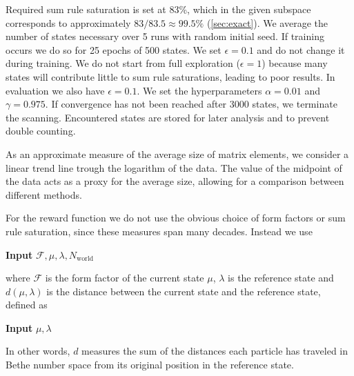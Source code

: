 \documentclass[11pt, a4paper]{report} %
\begin{document}
Required sum rule saturation is set at 83\%, which in the given subspace corresponds to approximately \(83/83.5\approx99.5\%\) (\cref{sec:exact}).
We average the number of states necessary over 5 runs with random initial seed.
If training occurs we do so for 25 epochs of 500 states.
We set \(\epsilon=0.1\) and do not change it during training.
We do not start from full exploration (\(\epsilon=1\)) because many states will contribute little to sum rule saturations, leading to poor results.
In evaluation we also have \(\epsilon=0.1\).
We set the hyperparameters \(\alpha=0.01\) and \(\gamma = 0.975\).
If convergence has not been reached after 3000 states, we terminate the scanning.
Encountered states are stored for later analysis and to prevent double counting.

As an approximate measure of the average size of matrix elements, we consider a linear trend line trough the logarithm of the  data.
The value of the midpoint of the data acts as a proxy for the average size, allowing for a comparison between different methods.

For the reward function we do not use the obvious choice of form factors or sum rule saturation, since these measures span many decades.
Instead we use
\begin{algorithm}[H]
   \hspace*{\algorithmicindent} \textbf{Input} $\mathcal{F}, \mu, \lambda, N_{\mathrm{world}}$ 
   \begin{algorithmic}[1]
     \Else{}
     \EndIf{}
  \end{algorithmic}
\end{algorithm}
\noindent
where \(\mathcal{F}\) is the form factor of the current state \(\mu\), \(\lambda\) is the reference state and \(d(\mu, \lambda)\) is the distance between the current state and the reference state, defined as
\begin{algorithm}[H]
   \hspace*{\algorithmicindent} \textbf{Input} $\mu, \lambda$ 
   \begin{algorithmic}[1]
     \vspace{3mm}
     \EndFor{}
  \end{algorithmic}
\end{algorithm}
\noindent
In other words, \(d\) measures the sum of the distances each particle has traveled in Bethe number space from its original position in the reference state.
\end{document}
